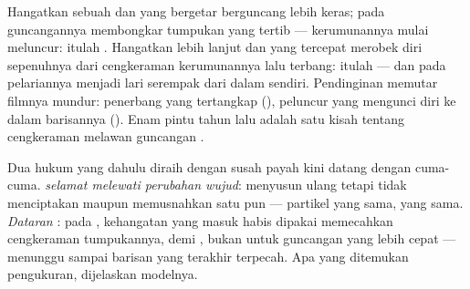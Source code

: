 \begin{example}\label{ex:g7:states-of-matter:doors}
Hangatkan sebuah  dan  yang bergetar berguncang
lebih keras; pada  guncangannya membongkar tumpukan yang
tertib --- kerumunannya mulai meluncur: itulah . Hangatkan
 lebih lanjut dan  yang tercepat merobek diri
sepenuhnya dari cengkeraman kerumunannya lalu terbang: itulah
 --- dan pada  pelariannya menjadi lari serempak
dari dalam  sendiri. Pendinginan memutar filmnya mundur:
penerbang yang tertangkap (), peluncur yang mengunci diri
ke dalam barisannya (). Enam pintu tahun lalu adalah satu
kisah tentang cengkeraman  melawan guncangan .
\end{example}

\begin{example}\label{ex:g7:states-of-matter:free}
Dua hukum yang dahulu diraih dengan susah payah kini datang dengan
cuma-cuma. \emph{ selamat melewati perubahan wujud}: 
menyusun ulang  tetapi tidak menciptakan maupun memusnahkan
satu pun --- partikel yang sama,  yang sama. \emph{Dataran }:
pada , kehangatan yang masuk habis dipakai memecahkan
cengkeraman tumpukannya,  demi , bukan untuk guncangan
yang lebih cepat ---  menunggu sampai barisan yang
terakhir terpecah. Apa yang ditemukan pengukuran, dijelaskan modelnya.
\end{example}

